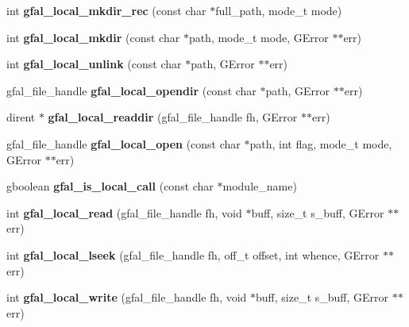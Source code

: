 \begin{CompactItemize}
\item 
int \textbf{gfal\_\-local\_\-mkdir\_\-rec} (const char $\ast$full\_\-path, mode\_\-t mode)\label{gfal__posix__local__file_8c_4cb0dd1292a24921b9f693a836dc5771}

\item 
int \textbf{gfal\_\-local\_\-mkdir} (const char $\ast$path, mode\_\-t mode, GError $\ast$$\ast$err)\label{gfal__posix__local__file_8c_29c13ce3294eab970124d188fab1c567}

\item 
int \textbf{gfal\_\-local\_\-unlink} (const char $\ast$path, GError $\ast$$\ast$err)\label{gfal__posix__local__file_8c_4c00224b96c79f922500d9dc6a8d0a2c}

\item 
gfal\_\-file\_\-handle \textbf{gfal\_\-local\_\-opendir} (const char $\ast$path, GError $\ast$$\ast$err)\label{gfal__posix__local__file_8c_56dc809549c9ff1f7f245619fae1dea5}

\item 
dirent $\ast$ \textbf{gfal\_\-local\_\-readdir} (gfal\_\-file\_\-handle fh, GError $\ast$$\ast$err)\label{gfal__posix__local__file_8c_62b4c61d92b03111251803bc1f0a56b5}

\item 
gfal\_\-file\_\-handle \textbf{gfal\_\-local\_\-open} (const char $\ast$path, int flag, mode\_\-t mode, GError $\ast$$\ast$err)\label{gfal__posix__local__file_8c_b596322ecc96fdc80c6c21802483f1d4}

\item 
gboolean \textbf{gfal\_\-is\_\-local\_\-call} (const char $\ast$module\_\-name)\label{gfal__posix__local__file_8c_41bf6452e794fbfd86b1cfd95fe61f5b}

\item 
int \textbf{gfal\_\-local\_\-read} (gfal\_\-file\_\-handle fh, void $\ast$buff, size\_\-t s\_\-buff, GError $\ast$$\ast$err)\label{gfal__posix__local__file_8c_45d46420d93abbaa7bbeb345bd8a6584}

\item 
int \textbf{gfal\_\-local\_\-lseek} (gfal\_\-file\_\-handle fh, off\_\-t offset, int whence, GError $\ast$$\ast$err)\label{gfal__posix__local__file_8c_3e1930273b0fa1021de561b1f1598f4a}

\item 
int \textbf{gfal\_\-local\_\-write} (gfal\_\-file\_\-handle fh, void $\ast$buff, size\_\-t s\_\-buff, GError $\ast$$\ast$err)\label{gfal__posix__local__file_8c_b9335b2236704108f4492032685d5ba2}


\end{CompactItemize}
